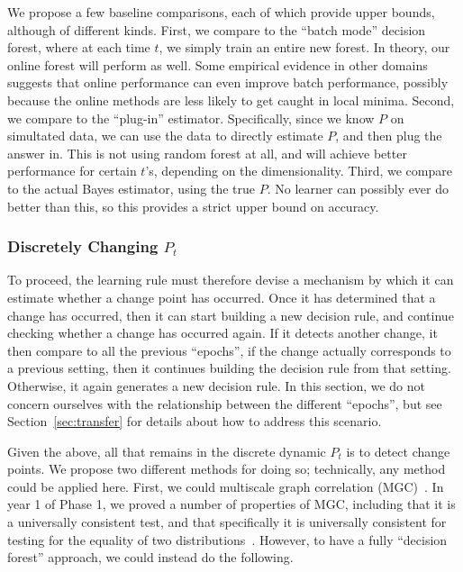\documentclass{article}
\begin{document}
We propose a few baseline comparisons, each of which provide upper bounds, although of different kinds.  First, we compare to the ``batch mode'' decision forest, where at each time $t$, we simply train an entire new forest.  In theory, our online forest will perform as well.  Some empirical evidence in other domains suggests that online performance can even improve batch performance, possibly because the online methods are less likely to get caught in local minima.  Second, we compare to the ``plug-in'' estimator.  Specifically, since we know $P$ on simultated data, we can use the data to directly estimate $P$, and then plug the answer in.  This is not using random forest at all, and will achieve better performance for certain $t$'s, depending on the dimensionality.  Third, we compare to the actual Bayes estimator, using the true $P$.  No learner can possibly ever do better than this, so this provides a strict upper bound on accuracy. 


\subsubsection*{Discretely Changing $P_t$}

To proceed, the learning rule must therefore devise a mechanism by which it can estimate whether a change point has occurred. Once it has determined that a change has occurred, then it can start building a new decision rule, and continue checking whether a change has occurred again.  If it detects another change, it then compare to all the previous ``epochs'', if the change actually corresponds to a previous setting, then it continues building the decision rule from that setting.  Otherwise, it again generates a new decision rule. In this section, we do not concern ourselves with the relationship between the different ``epochs'', but see Section~\ref{sec:transfer} for details about how to address this scenario.   

Given the above, all that remains in the discrete dynamic $P_t$ is to detect change points. We propose two different methods for doing so; technically, any method could be applied here. First, we could multiscale graph correlation (MGC)~\cite{Shen2016-fo, Shen2017-ub}.  In year 1 of Phase 1, we proved a number of properties of MGC, including that it is a universally consistent test, and that specifically it is universally consistent for testing for the equality of two distributions~\cite{Shen2018-st}.  However, to have a fully ``decision forest'' approach, we could instead do the following. 
\end{document}

